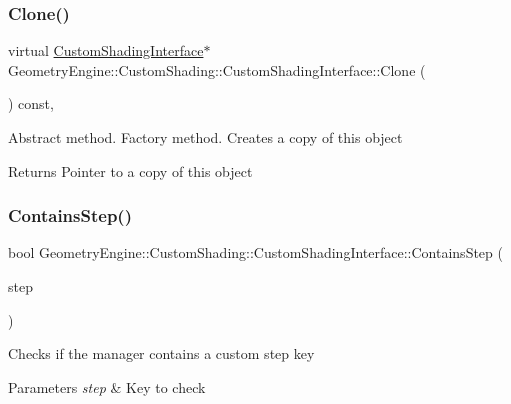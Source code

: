 \subsubsection{\texorpdfstring{Clone()}{Clone()}}
{\footnotesize\ttfamily virtual \mbox{\hyperlink{class_geometry_engine_1_1_custom_shading_1_1_custom_shading_interface}{Custom\+Shading\+Interface}}$\ast$ Geometry\+Engine\+::\+Custom\+Shading\+::\+Custom\+Shading\+Interface\+::\+Clone (\begin{DoxyParamCaption}{ }\end{DoxyParamCaption}) const\hspace{0.3cm}{\ttfamily [inline]}, {\ttfamily [virtual]}}

Abstract method. Factory method. Creates a copy of this object \begin{DoxyReturn}{Returns}
Pointer to a copy of this object 
\end{DoxyReturn}
\mbox{\label{class_geometry_engine_1_1_custom_shading_1_1_custom_shading_interface_a3702af941a05a692b3e9c8f9597a0f76}} 
\subsubsection{\texorpdfstring{ContainsStep()}{ContainsStep()}}
{\footnotesize\ttfamily bool Geometry\+Engine\+::\+Custom\+Shading\+::\+Custom\+Shading\+Interface\+::\+Contains\+Step (\begin{DoxyParamCaption}\item[{\mbox{\hyperlink{namespace_geometry_engine_1_1_custom_shading_a2dc236a5b567da5099069ce2b2be5609}{Custom\+Shading\+Steps}}}]{step }\end{DoxyParamCaption})\hspace{0.3cm}{\ttfamily [inline]}}

Checks if the manager contains a custom step key 
\begin{DoxyParams}{Parameters}
{\em step} & Key to check \\
\hline
\end{DoxyParams}
\mbox{\label{class_geometry_engine_1_1_custom_shading_1_1_custom_shading_interface_a7ecb7c9e61cb2e8f2cca7a4f2f156539}} 
